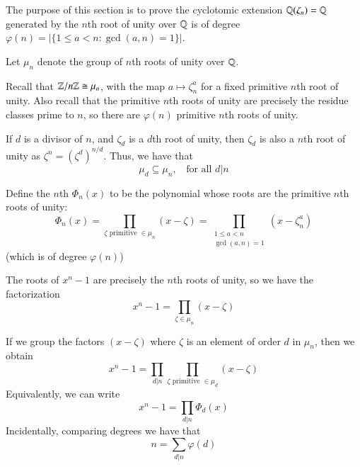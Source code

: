 The purpose of this section is to prove the cyclotomic extension $\mathbb Q(\zeta_n) =\mathbb Q$ generated by the $n$th root of unity over $\mathbb Q$ is of degree $\varphi(n) = |\{1\leq a < n: \gcd(a,n) = 1\}|$. 

\begin{definition}
    Let $\mu_n$ denote the group of $n$th roots of unity over $\mathbb Q$.
\end{definition}


Recall that $\mathbb Z/n\mathbb Z \cong \mu_n$, with the map $a \mapsto \zeta_n^a$ for a fixed primitive $n$th root of unity. Also recall that the primitive $n$th roots of unity are precisely the residue classes prime to $n$, so there are $\varphi(n)$ primitive $n$th roots of unity.

If $d$ is a divisor of $n$, and $\zeta_d$ is a $d$th root of unity, then $\zeta_d$ is also a $n$th root of unity as $\zeta^n = (\zeta^d)^{n/d}$. Thus, we have that \begin{equation*}
    \mu_d \subseteq \mu_n, \;\;\text{ for all } d\vert n
\end{equation*}

\begin{definition}
    Define the $n$th  $\Phi_n(x)$ to be the polynomial whose roots are the primitive $n$th roots of unity: \begin{equation*}
        \Phi_n(x) = \prod_{\zeta \text{ primitive } \in \mu_n}(x-\zeta) = \prod_{\begin{array}{cc} 1\leq a < n \\ \gcd(a,n)=1\end{array}}(x-\zeta_n^a)
    \end{equation*}
    (which is of degree $\varphi(n)$)
\end{definition}

The roots of $x^n - 1$ are precisely the $n$th roots of unity, so we have the factorization \begin{equation*}
    x^n - 1 = \prod_{\zeta \in \mu_n}(x-\zeta)
\end{equation*}

If we group the factors $(x-\zeta)$ where $\zeta$ is an element of order $d$ in $\mu_n$, then we obtain \begin{equation*}
    x^n - 1 = \prod_{d\vert n}\prod_{\zeta \text{ primitive } \in \mu_d}(x-\zeta)
\end{equation*}
Equivalently, we can write \begin{equation*}
    x^n - 1 = \prod_{d\vert n}\Phi_d(x)
\end{equation*}
Incidentally, comparing degrees we have that \begin{equation*}
    n = \sum_{d\vert n}\varphi(d)
\end{equation*}


